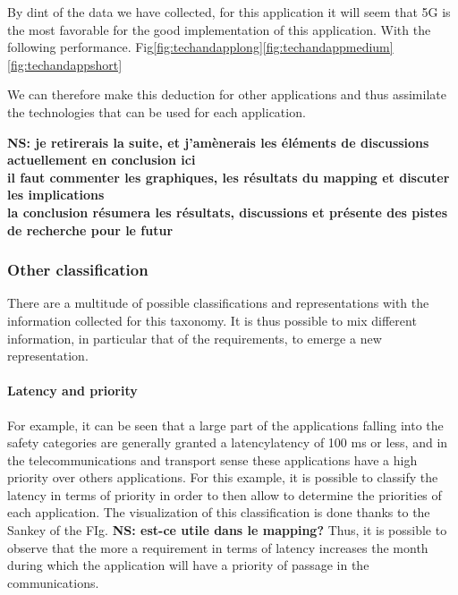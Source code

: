 By dint of the data we have collected, for this application it will seem that 5G is the most favorable for the good implementation of this application. With the following performance. Fig\ref{fig:techandapplong}\ref{fig:techandappmedium}\ref{fig:techandappshort}


We can therefore make this deduction for other applications and thus assimilate the technologies that can be used for each application. 

{\bf NS: je retirerais la suite, et j'amènerais les éléments de discussions actuellement en conclusion ici\\
  il faut commenter les graphiques, les résultats du mapping et discuter les implications\\
  la conclusion résumera les résultats, discussions et présente des pistes de recherche pour le futur}

\subsubsection{Other classification}

There are a multitude of possible classifications and representations with the information collected for this taxonomy. It is thus possible to mix different information, in particular that of the requirements, to emerge a new representation.

\paragraph{Latency and priority}
For example, it can be seen that a large part of the applications falling into the safety categories are generally granted a latencylatency of 100 ms or less, and in the telecommunications and transport sense these applications have a high priority over others applications.
For this example, it is possible to classify the latency in terms of priority in order to then allow to determine the priorities of each application. The visualization of this classification is done thanks to the Sankey of the FIg.%
{\bf NS: est-ce utile dans le mapping?}
Thus, it is possible to observe that the more a requirement in terms of latency increases the month during which the application will have a priority of passage in the communications. 
